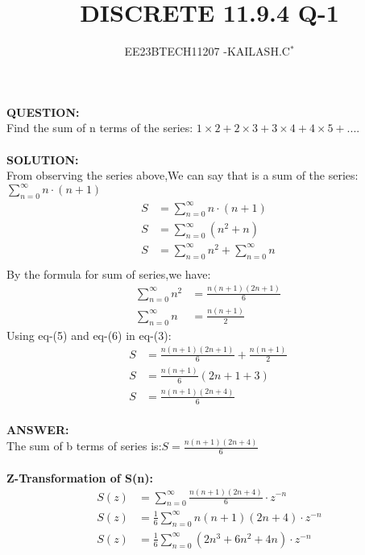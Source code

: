 \documentclass[journal,12pt,twocolumn]{IEEEtran}
\theoremstyle{remark}
\begin{document}

\vspace{3cm}

\title{DISCRETE 11.9.4 Q-1}
\author{EE23BTECH11207 -KAILASH.C$^{*}$%
}
\maketitle
\newpage
\bigskip

\renewcommand{\thefigure}{\theenumi}
\renewcommand{\thetable}{\theenumi}


\textbf{QUESTION:}\\
Find the sum of n terms of the series:
$1\times2+2\times3+3\times4+4\times5+....$\\ \\
\textbf{SOLUTION:}\\
From observing the series above,We can say that is a sum of the series:$\sum_{n=0}^{\infty} n \cdot (n+1)$
\begin{align}
     S&=\sum_{n=0}^{\infty} n \cdot (n+1)\\
     S&=\sum_{n=0}^{\infty} (n^2 + n)\\
     S&=\sum_{n=0}^{\infty} n^2 + \sum_{n=0}^{\infty} n\ \\
\end{align}
By the formula for sum of series,we have:
\begin{align}
    \sum_{n=0}^{\infty} n^2&=\frac{n(n+1)(2n+1)}{6}\ \\
    \sum_{n=0}^{\infty} n&=\frac{n(n+1)}{2}\
\end{align}
Using eq-(5) and eq-(6) in eq-(3):
\begin{align}
    S&=\frac{n(n+1)(2n+1)}{6} + \frac{n(n+1)}{2}\ \\
    S&=\frac{n(n+1)}{6} (2n+1 + 3)\ \\
    S&=\frac{n(n+1)(2n+4)}{6}\
\end{align}\\
\textbf{ANSWER:}\\
The sum of b terms of series is:$S=\frac{n(n+1)(2n+4)}{6}$\\ \\
\textbf{Z-Transformation of S(n):}\\
\begin{align}
S(z)&=\sum_{n=0}^{\infty} \frac{n(n+1)(2n+4)}{6} \cdot z^{-n}\\
S(z)&=\frac{1}{6} \sum_{n=0}^{\infty} n(n+1)(2n+4) \cdot z^{-n}\\
S(z)&=\frac{1}{6} \sum_{n=0}^{\infty} (2n^3 + 6n^2 + 4n) \cdot z^{-n}
\end{align}
\end{document}
